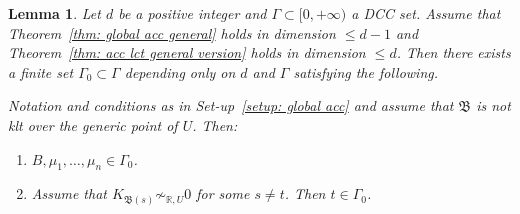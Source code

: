 \documentclass[11pt,reqno]{amsart}
\numberwithin{equation}{section}
\newcommand{\Bb}{{\mathfrak{B}}}
\newcommand{\Ii}{\Gamma}
\newtheorem{lem}[thm]{Lemma}
\theoremstyle{definition}
\begin{document}
\begin{lem}\label{lem: when exist lc center}
Let $d$ be a positive integer and $\Ii\subset [0,+\infty)$ a DCC set. Assume that Theorem~\ref{thm: global acc general} holds in dimension $\leq d-1$ and Theorem~\ref{thm: acc lct general version} holds in dimension $\leq d$. Then there exists a finite set $\Ii_0\subset\Ii$ depending only on $d$ and $\Ii$ satisfying the following.

Notation and conditions as in Set-up~\ref{setup: global acc} and assume that $\Bb$ is not klt over the generic point of $U$. Then:
\begin{enumerate}
    \item $B,\mu_1,\dots,\mu_n\in\Ii_0$.
    \item Assume that $K_{\Bb(s)}\not\sim_{\mathbb R,U}0$ for some $s\neq t$. Then $t\in\Ii_0$.
\end{enumerate}
\end{lem}
\end{document}
